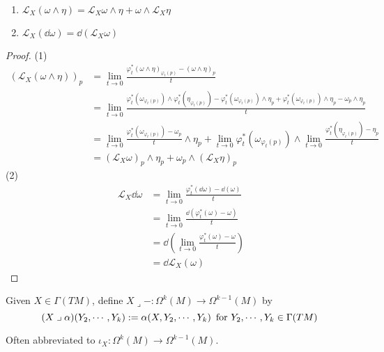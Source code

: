\begin{lemma}
    \,
    \begin{enumerate}[label=(\arabic*)]
        \item  $ \mathcal{L}_X(\omega\wedge \eta)=\mathcal{L}_X\omega\wedge\eta+\omega\wedge\mathcal{L}_X\eta $ 
        \item  $ \mathcal{L}_X(\dd \omega)=\dd(\mathcal{L}_X\omega) $ 
    \end{enumerate}
\end{lemma}
\begin{proof}
    (1)\begin{equation}
            \begin{aligned}
                \left(\mathcal{L}_X(\omega\wedge\eta)\right)_p&=\lim_{t\to 0}\frac{\varphi_t^*(\omega\wedge\eta)_{\varphi_t(p)}-(\omega\wedge\eta)_p}{t}\\
                &=\lim_{t\to 0}\frac{\varphi_t^*(\omega_{\varphi_t(p)})\wedge\varphi_t^*(\eta_{\varphi_t(p)})-\varphi_t^*(\omega_{\varphi_t(p)})\wedge\eta_p+\varphi_t^*(\omega_{\varphi_t(p)})\wedge\eta_p-\omega_p\wedge\eta_p}{t}\\
                &=\lim_{t\to 0}\frac{\varphi_t^*(\omega_{\varphi_t(p)})-\omega_p}{t}\wedge\eta_p+\lim_{t\to 0}\varphi_t^*(\omega_{\varphi_t(p)})\wedge\lim_{t\to 0}\frac{\varphi_t^*(\eta_{\varphi_t(p)})-\eta_p}{t}\\
                &=\left(\mathcal{L}_X\omega\right)_p\wedge\eta_p+\omega_p\wedge\left(\mathcal{L}_X\eta\right)_p
            \end{aligned}
        \end{equation}
    (2)
    \begin{align*}
        \mathcal{L}_X\dd\omega&=\lim_{t\to 0}\frac{\varphi_t^*(\dd\omega)-\dd(\omega)}{t}\\
        &=\lim_{t\to 0}\frac{\dd (\varphi_t^*(\omega)-\omega)}{t}\\
        &=\dd\left(\lim_{t\to 0}\frac{\varphi_t^*(\omega)-\omega}{t}\right)\\
        &=\dd\mathcal{L}_X(\omega)
    \end{align*}
\end{proof}
Given  $ X\in \Gamma(TM) $, define   $ X\mathrel{\lrcorner} -:\Omega^k(M)\rightarrow \Omega^{k-1}(M)  $ by 
    \[(X\mathrel{\lrcorner}\alpha)(Y_2,\cdots,Y_k):=\alpha(X,Y_2,\cdots,Y_k)\,\text{ for  $ Y_2,\cdots,Y_k\in \Gamma(TM) $ }\] 
    
Often abbreviated to  $ \iota_X:\Omega^k(M)\rightarrow \Omega^{k-1}(M) $. 

